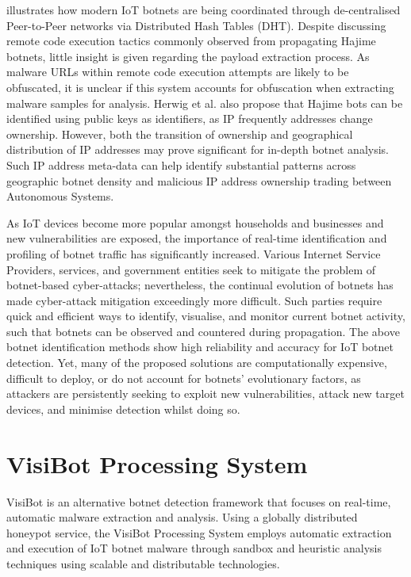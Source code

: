 \citet{Herwig2019} illustrates how modern IoT botnets are being coordinated through de-centralised Peer-to-Peer networks via Distributed Hash Tables (DHT). Despite discussing remote code execution tactics commonly observed from propagating Hajime botnets, little insight is given regarding the payload extraction process. As malware URLs within remote code execution attempts are likely to be obfuscated, it is unclear if this system accounts for obfuscation when extracting malware samples for analysis. Herwig et al. also propose that Hajime bots can be identified using public keys as identifiers, as IP frequently addresses change ownership. However, both the transition of ownership and geographical distribution of IP addresses may prove significant for in-depth botnet analysis. Such IP address meta-data can help identify substantial patterns across geographic botnet density and malicious IP address ownership trading between Autonomous Systems. 

As IoT devices become more popular amongst households and businesses and new vulnerabilities are exposed, the importance of real-time identification and profiling of botnet traffic has significantly increased. Various Internet Service Providers, services, and government entities seek to mitigate the problem of botnet-based cyber-attacks; nevertheless, the continual evolution of botnets has made cyber-attack mitigation exceedingly more difficult. Such parties require quick and efficient ways to identify, visualise, and monitor current botnet activity, such that botnets can be observed and countered during propagation. The above botnet identification methods show high reliability and accuracy for IoT botnet detection. Yet, many of the proposed solutions are computationally expensive, difficult to deploy, or do not account for botnets' evolutionary factors, as attackers are persistently seeking to exploit new vulnerabilities, attack new target devices, and minimise detection whilst doing so. 

\section{VisiBot Processing System}

VisiBot is an alternative botnet detection framework that focuses on real-time, automatic malware extraction and analysis. Using a globally distributed honeypot service, the VisiBot Processing System employs automatic extraction and execution of IoT botnet malware through sandbox and heuristic analysis techniques using scalable and distributable technologies. 

